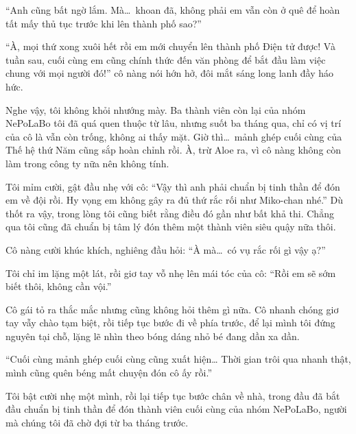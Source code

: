 \documentclass[../main.tex]{subfiles}
\begin{document}
``Anh cũng bất ngờ lắm. Mà\dots\ khoan đã, không phải em vẫn còn ở quê để hoàn tất mấy thủ tục trước khi lên thành phố sao?''

``À, mọi thứ xong xuôi hết rồi em mới chuyển lên thành phố Điện tử được! Và tuần sau, cuối cùng em cũng chính thức đến văn phòng để bắt đầu làm việc chung với mọi người đó!'' cô nàng nói hớn hở, đôi mắt sáng long lanh đầy háo hức.

Nghe vậy, tôi không khỏi nhướng mày. Ba thành viên còn lại của nhóm NePoLaBo tôi đã quá quen thuộc từ lâu, nhưng suốt ba tháng qua, chỉ có vị trí của cô là vẫn còn trống, không ai thấy mặt. Giờ thì\dots\ mảnh ghép cuối cùng của Thế hệ thứ Năm cũng sắp hoàn chỉnh rồi. À, trừ Aloe ra, vì cô nàng không còn làm trong công ty nữa nên không tính.

Tôi mỉm cười, gật đầu nhẹ với cô: ``Vậy thì anh phải chuẩn bị tinh thần để đón em về đội rồi. Hy vọng em không gây ra đủ thứ rắc rối như Miko-chan nhé.'' Dù thốt ra vậy, trong lòng tôi cũng biết rằng điều đó gần như bất khả thi. Chẳng qua tôi cũng đã chuẩn bị tâm lý đón thêm một thành viên siêu quậy nữa thôi.

Cô nàng cười khúc khích, nghiêng đầu hỏi: ``À mà\dots\ có vụ rắc rối gì vậy ạ?''

Tôi chỉ im lặng một lát, rồi giơ tay vỗ nhẹ lên mái tóc của cô: ``Rồi em sẽ sớm biết thôi, không cần vội.''

Cô gái tỏ ra thắc mắc nhưng cũng không hỏi thêm gì nữa. Cô nhanh chóng giơ tay vẫy chào tạm biệt, rồi tiếp tục bước đi về phía trước, để lại mình tôi đứng nguyên tại chỗ, lặng lẽ nhìn theo bóng dáng nhỏ bé đang dần xa dần.

``Cuối cùng mảnh ghép cuối cùng cũng xuất hiện… Thời gian trôi qua nhanh thật, mình cũng quên béng mất chuyện đón cô ấy rồi.''

Tôi bật cười nhẹ một mình, rồi lại tiếp tục bước chân về nhà, trong đầu đã bắt đầu chuẩn bị tinh thần để đón thành viên cuối cùng của nhóm NePoLaBo, người mà chúng tôi đã chờ đợi từ ba tháng trước.
\end{document}
